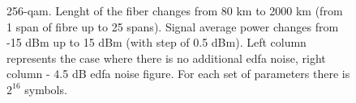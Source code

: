 \begin{figure}[htpb]
    \begin{minipage}[h]{0.48\linewidth}
    \end{minipage}
    \hfill
    \begin{minipage}[h]{0.48\linewidth}
    \end{minipage}
    \caption{256-\acrshort{qam}. Lenght of the fiber changes from 80 km to 2000 km (from 1 span of fibre up to 25 spans). Signal average power changes from -15 dBm up to 15 dBm (with step of 0.5 dBm). Left column represents the case where there is no additional \acrshort{edfa} noise, right column - 4.5 dB \acrshort{edfa} noise figure. For each set of parameters there is $2^{16}$ symbols.}
    \label{fig:hpcom_example2}
\end{figure}



